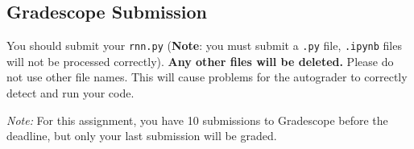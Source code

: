 \documentclass[11pt,addpoints,answers]{exam}
\begin{document}
\subsection{Gradescope Submission}

You should submit your \texttt{rnn.py} (\textbf{Note}: you must submit a \texttt{.py} file, \texttt{.ipynb} files will not be processed correctly). \textbf{Any other files will be deleted.} Please do not use other file names. This will cause problems for the autograder to correctly detect and run your code.


\textit{Note:} For this assignment, you have 10 submissions to Gradescope before the deadline, but only your last submission will be graded.
\end{document}
